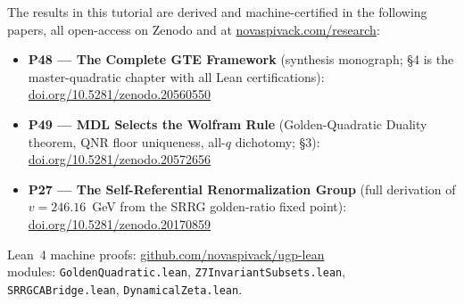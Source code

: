 \documentclass[11pt,a4paper]{article}
\newcommand{\lean}[1]{\texttt{#1}}
\begin{document}
\begin{tcolorbox}[colback=orange!8,colframe=orange!50!black,
  title=\textbf{Primary Sources}]
The results in this tutorial are derived and machine-certified in the following papers,
all open-access on Zenodo and at
\href{https://novaspivack.com/research}{novaspivack.com/research}:
\begin{itemize}[itemsep=3pt]
  \item \textbf{P48 --- The Complete GTE Framework} (synthesis monograph;
    §4 is the master-quadratic chapter with all Lean certifications):\\
    \href{https://doi.org/10.5281/zenodo.20560550}{doi.org/10.5281/zenodo.20560550}
  \item \textbf{P49 --- MDL Selects the Wolfram Rule} (Golden-Quadratic
    Duality theorem, QNR floor uniqueness, all-$q$ dichotomy; §3):\\
    \href{https://doi.org/10.5281/zenodo.20572656}{doi.org/10.5281/zenodo.20572656}
  \item \textbf{P27 --- The Self-Referential Renormalization Group} (full
    derivation of $v = 246.16$~GeV from the SRRG golden-ratio fixed point):\\
    \href{https://doi.org/10.5281/zenodo.20170859}{doi.org/10.5281/zenodo.20170859}
\end{itemize}
Lean~4 machine proofs:
\href{https://github.com/novaspivack/ugp-lean}{github.com/novaspivack/ugp-lean}\\
modules: \lean{GoldenQuadratic.lean}, \lean{Z7InvariantSubsets.lean},
\lean{SRRGCABridge.lean}, \lean{DynamicalZeta.lean}.
\end{tcolorbox}


\end{document}
